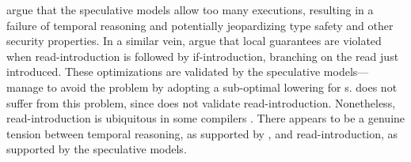 \citet{DBLP:journals/pacmpl/JagadeesanJR20} argue that the speculative models
allow too many executions, resulting in a failure of temporal reasoning and
potentially jeopardizing type safety and other security properties.  In a
similar vein, \citet{promising-ldrf} argue that local \drf{} guarantees are
violated when read-introduction is followed by if-introduction, branching on
the read just introduced.  These optimizations are validated by the
speculative models---\citeauthor{promising-ldrf} manage to avoid the problem
by adopting a sub-optimal lowering for \RMW{}s.  \PwT{} does not suffer from
this problem, since \PwT{} does not validate read-introduction.  Nonetheless,
read-introduction is ubiquitous in some compilers
\cite{DBLP:conf/pldi/LeeKSHDMRL17}.  There appears to be a genuine tension
between temporal reasoning, as supported by \PwT{}, and read-introduction, as
supported by the speculative models.

